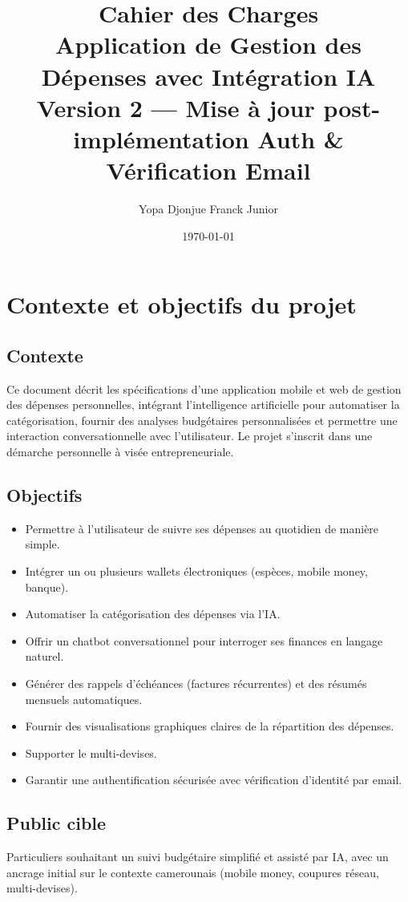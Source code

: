 \documentclass[11pt,a4paper]{article}
\title{\textbf{Cahier des Charges} \\ \large Application de Gestion des Dépenses avec Intégration IA \\ \normalsize Version 2 --- Mise à jour post-implémentation Auth \& Vérification Email}
\author{Yopa Djonjue Franck Junior}
\date{\today}
\begin{document}
\maketitle

\section{Contexte et objectifs du projet}

\subsection{Contexte}
Ce document décrit les spécifications d'une application mobile et web de gestion des dépenses personnelles, intégrant l'intelligence artificielle pour automatiser la catégorisation, fournir des analyses budgétaires personnalisées et permettre une interaction conversationnelle avec l'utilisateur. Le projet s'inscrit dans une démarche personnelle à visée entrepreneuriale.

\subsection{Objectifs}
\begin{itemize}[leftmargin=*]
    \item Permettre à l'utilisateur de suivre ses dépenses au quotidien de manière simple.
    \item Intégrer un ou plusieurs wallets électroniques (espèces, mobile money, banque).
    \item Automatiser la catégorisation des dépenses via l'IA.
    \item Offrir un chatbot conversationnel pour interroger ses finances en langage naturel.
    \item Générer des rappels d'échéances (factures récurrentes) et des résumés mensuels automatiques.
    \item Fournir des visualisations graphiques claires de la répartition des dépenses.
    \item Supporter le multi-devises.
    \item Garantir une authentification sécurisée avec vérification d'identité par email.
\end{itemize}

\subsection{Public cible}
Particuliers souhaitant un suivi budgétaire simplifié et assisté par IA, avec un ancrage initial sur le contexte camerounais (mobile money, coupures réseau, multi-devises).
\end{document}

